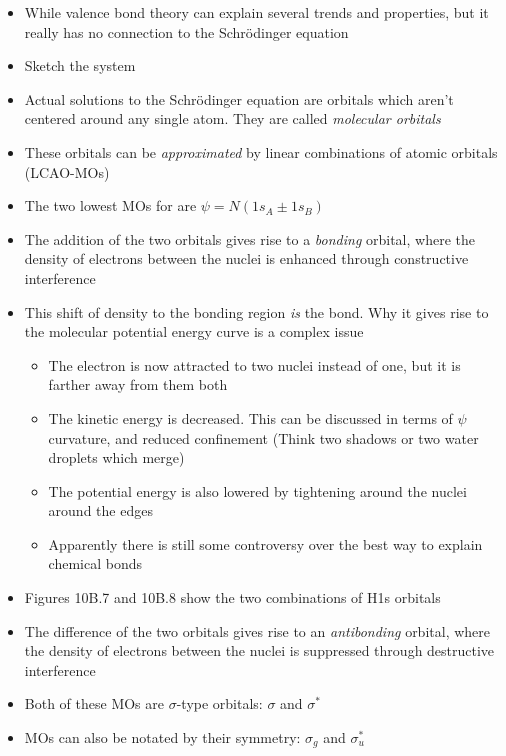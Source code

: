 \documentclass[12pt, openany, letterpaper]{memoir}
\begin{document}
\begin{itemize}
	\item While valence bond theory can explain several trends and properties, but it really has no connection to the Schr\"odinger equation
	\item Sketch the  system	
	\item Actual solutions to the Schr\"odinger equation are orbitals which aren't centered around any single atom. They are called \emph{molecular orbitals}
	\item These orbitals can be \emph{approximated} by linear combinations of atomic orbitals (LCAO-MOs)
	\item The two lowest MOs for  are $\psi = N\left(1s_A\pm1s_B\right)$
	\item The addition of the two orbitals gives rise to a \emph{bonding} orbital, where the density of electrons between the nuclei is enhanced through constructive interference
	\item This shift of density to the bonding region \emph{is} the bond. Why it gives rise to the molecular potential energy curve is a complex issue
	\begin{itemize}
		\item The electron is now attracted to two nuclei instead of one, but it is farther away from them both
		\item The kinetic energy is decreased. This can be discussed in terms of $\psi$ curvature, and reduced confinement (Think two shadows or two water droplets which merge)
		\item The potential energy is also lowered by tightening around the nuclei around the edges
		\item Apparently there is still some controversy over the best way to explain chemical bonds
	\end{itemize}
	\item Figures 10B.7 and 10B.8 show the two combinations of H1s orbitals
	\item The difference of the two orbitals gives rise to an \emph{antibonding} orbital, where the density of electrons between the nuclei is suppressed through destructive interference
	\item Both of these MOs are $\sigma$-type orbitals: $\sigma$ and $\sigma^*$
	\item MOs can also be notated by their symmetry: $\sigma_g$ and $\sigma^*_u$	
\end{itemize}
\end{document}
